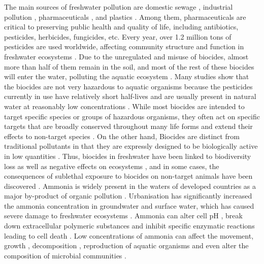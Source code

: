 \documentclass[11pt, a4paper]{article}
\begin{document}
\begin{spacing}{1.5}
The main sources of freshwater pollution are domestic sewage \citep{hendriksen2019global}, industrial pollution \citep{ho2012industrial}, pharmaceuticals \citep{caracciolo2015pharmaceuticals}, and plastics \citep{blettler2019threats}. Among them, pharmaceuticals are critical to preserving public health and quality of life, including antibiotics, pesticides, herbicides, fungicides, etc. Every year, over 1.2 million tons of pesticides are used worldwide, affecting community structure and function in freshwater ecosystems \citep{gustavson2003effects, rohr2005effects, brovini2021three}. Due to the unregulated and misuse of biocides, almost more than half of them remain in the soil, and most of the rest of these biocides will enter the water, polluting the aquatic ecosystem \citep{babcock1992impact}. Many studies show that the biocides are not very hazardous to aquatic organisms because the pesticides currently in use have relatively short half-lives \citep{fantke2014estimating} and are usually present in natural water at reasonably low concentrations \citep{macherius2014triclocarban, santos2009occurrence}. While most biocides are intended to target specific species or groups of hazardous organisms, they often act on specific targets that are broadly conserved throughout many life forms and extend their effects to non-target species \citep{davidson2001declines}. On the other hand, Biocides are distinct from traditional pollutants in that they are expressly designed to be biologically active in low quantities \citep{garry2004pesticides}. Thus, biocides in freshwater have been linked to biodiversity loss as well as negative effects on ecosystems \citep{bridges2000long, horrigan2002sustainable}, and in some cases, the consequences of sublethal exposure to biocides on non-target animals have been discovered \citep{desneux2007sublethal, kurenbach2015sublethal, saravanan2011haematological}. Ammonia is widely present in the waters of developed countries as a major by-product of organic pollution \citep{abel2002water}. Urbanisation has significantly increased the ammonia concentration in groundwater and surface water, which has caused severe damage to freshwater ecosystems \citep{constable2003ecological,smith2003eutrophication}. Ammonia can alter cell pH \citep{zhang2018free}, break down extracellular polymeric substances and inhibit specific enzymatic reactions leading to cell death \citep{liu2019roles}. Low concentrations of ammonia can affect the movement, growth \citep{alonso2004toxic}, decomposition \citep{yenigun2013ammonia}, reproduction of aquatic organisms and even alter the composition of microbial communities \citep{zhang2020ammonia}.


\end{spacing}
\end{document}
